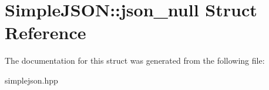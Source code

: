 \hypertarget{struct_simple_j_s_o_n_1_1json__null}{\section{Simple\+J\+S\+O\+N\+:\+:json\+\_\+null Struct Reference}
\label{struct_simple_j_s_o_n_1_1json__null}
}


The documentation for this struct was generated from the following file\+:\begin{DoxyCompactItemize}
\item 
simplejson.\+hpp\end{DoxyCompactItemize}
